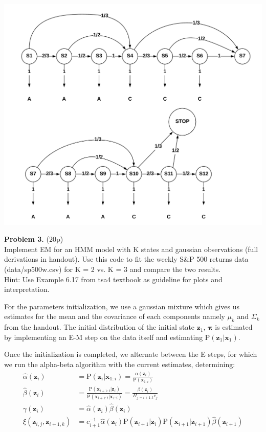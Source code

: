 \documentclass[12pt]{article}
\newcommand{\p}[1]{\mathrm{P}\left(#1 \right)}
\newcommand{\vect}[1]{\mathbf{#1}}
\begin{document}
\begin{center}
	\includegraphics[width=1\linewidth]{figures/problem-2-2.png} 
\end{center}


\noindent \textbf{Problem 3.}  (20p)\\ 
Implement EM for an HMM model with K states and gaussian observations (full derivations in handout). 
Use this code to fit the weekly S\&P 500 returns data (data/sp500w.csv) for K = 2 vs. K = 3 and compare the two results. \\
Hint: Use Example 6.17 from tsa4 textbook as guideline for plots and interpretation.

For the parameters initialization, we use a gaussian mixture which gives us estimates for the mean and the covariance of each components namely $\mu_k$ and $\Sigma_k$ from
the handout. The initial distribution of the initial state $\vect{z}_1$, $\vect{\pi}$ is estimated by implementing an E-M step on the data itself and estimating $\p{\vect{z}_1|\vect{x}_1}$. 

Once the initialization is completed, we alternate between the E steps, for which we run the alpha-beta algorithm with the current estimates, determining:
\begin{align*}
	\hat{\alpha}(\vect{z}_i)			&=	\p{\vect{z}_i | \vect{x}_{1:i}} 	=	\frac{\alpha(\vect{z}_i)} {\p{ \vect{x}_{1:i} }}	\\
	\hat{\beta}(\vect{z}_i)				&=	\frac{ \p{ \vect{x}_{i+1:t} | \vect{z}_i } }  {\p{ \vect{x}_{i+1:t} |  \vect{x}_{1:i}}}	= \frac{ \beta(\vect{z}_i) } {\Pi _{j=i+1:t} c_j} \\
	\gamma(\vect{z}_i)				&= 	\hat{\alpha}(\vect{z}_i) \hat{\beta}(\vect{z}_i)	\\
	\xi(\vect{z}_{i,j}, \vect{z}_{i+1,k})	&= 	c_{i+1}^{-1} \hat{\alpha}(\vect{z}_i) \p{\vect{z}_{i+1} | \vect{z}_i} \p{\vect{x}_{i+1} | \vect{z}_{i+1}} \hat{\beta}(\vect{z}_{i+1})	
\end{align*}
\end{document}
